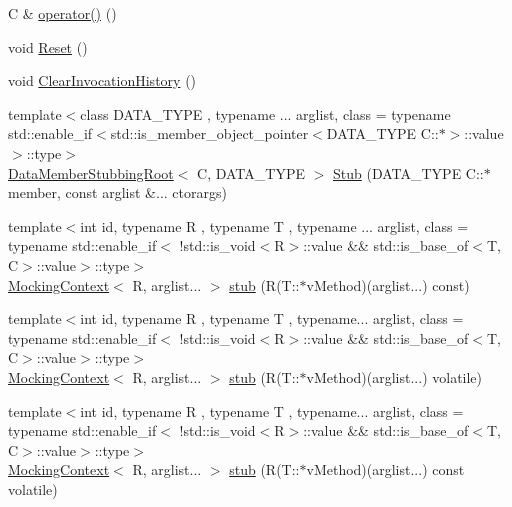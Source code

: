 \begin{DoxyCompactItemize}
\item 
C \& \mbox{\hyperlink{classfakeit_1_1Mock_a128ca35e5c7648e0612f017cb7076498}{operator()}} ()
\item 
void \mbox{\hyperlink{classfakeit_1_1Mock_a69c66fc56c032205843b05d91f339a55}{Reset}} ()
\item 
void \mbox{\hyperlink{classfakeit_1_1Mock_ac9e21ef9c73c735287c7fd3dd110aafc}{Clear\+Invocation\+History}} ()
\item 
{\footnotesize template$<$class D\+A\+T\+A\+\_\+\+T\+Y\+PE , typename ... arglist, class  = typename std\+::enable\+\_\+if$<$std\+::is\+\_\+member\+\_\+object\+\_\+pointer$<$\+D\+A\+T\+A\+\_\+\+T\+Y\+P\+E C\+::$\ast$$>$\+::value$>$\+::type$>$ }\\\mbox{\hyperlink{classfakeit_1_1DataMemberStubbingRoot}{Data\+Member\+Stubbing\+Root}}$<$ C, D\+A\+T\+A\+\_\+\+T\+Y\+PE $>$ \mbox{\hyperlink{classfakeit_1_1Mock_ae210824251ca071933f8a651bbe56047}{Stub}} (D\+A\+T\+A\+\_\+\+T\+Y\+PE C\+::$\ast$member, const arglist \&... ctorargs)
\item 
{\footnotesize template$<$int id, typename R , typename T , typename ... arglist, class  = typename std\+::enable\+\_\+if$<$                !std\+::is\+\_\+void$<$\+R$>$\+::value \&\& std\+::is\+\_\+base\+\_\+of$<$\+T, C$>$\+::value$>$\+::type$>$ }\\\mbox{\hyperlink{classfakeit_1_1MockingContext}{Mocking\+Context}}$<$ R, arglist... $>$ \mbox{\hyperlink{classfakeit_1_1Mock_a7a8f38b58b068b35f263eee42d75c162}{stub}} (R(T\+::$\ast$v\+Method)(arglist...) const)
\item 
{\footnotesize template$<$int id, typename R , typename T , typename... arglist, class  = typename std\+::enable\+\_\+if$<$                !std\+::is\+\_\+void$<$\+R$>$\+::value \&\& std\+::is\+\_\+base\+\_\+of$<$\+T, C$>$\+::value$>$\+::type$>$ }\\\mbox{\hyperlink{classfakeit_1_1MockingContext}{Mocking\+Context}}$<$ R, arglist... $>$ \mbox{\hyperlink{classfakeit_1_1Mock_a6974858200b57469de78bf2a06d6fa02}{stub}} (R(T\+::$\ast$v\+Method)(arglist...) volatile)
\item 
{\footnotesize template$<$int id, typename R , typename T , typename... arglist, class  = typename std\+::enable\+\_\+if$<$                !std\+::is\+\_\+void$<$\+R$>$\+::value \&\& std\+::is\+\_\+base\+\_\+of$<$\+T, C$>$\+::value$>$\+::type$>$ }\\\mbox{\hyperlink{classfakeit_1_1MockingContext}{Mocking\+Context}}$<$ R, arglist... $>$ \mbox{\hyperlink{classfakeit_1_1Mock_a963fce628ddab338bc3ee984a137db31}{stub}} (R(T\+::$\ast$v\+Method)(arglist...) const volatile)

\end{DoxyCompactItemize}
